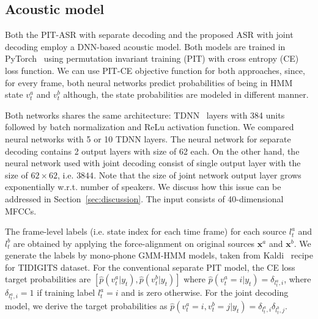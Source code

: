 \documentclass[a4paper]{article}
\newcommand{\spkrA}{a}
\newcommand{\spkrB}{b}
\def\x{{\mathbf x}}
\begin{document}
\subsection{Acoustic model}

Both the PIT-ASR with separate decoding and the proposed ASR with joint decoding employ a DNN-based acoustic model. Both models are trained in PyTorch~\cite{PyTorch} using permutation invariant training (PIT)\cite{kolbek2017,QIAN20181} with cross entropy (CE) loss function. We can use PIT-CE objective function for both approaches, since, for every frame, both neural networks predict probabilities of being in HMM state $v_t^\spkrA$ and $v_t^\spkrB$ although, the state probabilities are modeled in different manner.

Both networks shares the same architecture: TDNN~\cite{peddinti15b_tdnn} layers with 384 units followed by batch normalization and ReLu activation function. We compared neural networks with 5 or 10 TDNN layers. The neural network for separate decoding contains 2 output layers with size of 62 each. On the other hand, the neural network used with joint decoding consist of single output layer with the size of $62\times62$, i.e. $3844$. Note that the size of joint network output layer grows exponentially w.r.t. number of speakers. We discuss how this issue can be addressed in Section~\ref{sec:discussion}. The input consists of 40-dimensional MFCCs.

The frame-level labels (i.e. state index for each time frame) for each source $l_t^\spkrA$ and $l_t^\spkrB$ are obtained by applying the force-alignment on original sources $\x^\spkrA$ and $\x^\spkrB$.  We generate the labels by mono-phone GMM-HMM models, taken from Kaldi~\cite{Kaldi} recipe for TIDIGITS dataset.
For the conventional separate PIT model, the CE loss target probabilities
are $[\hat{p}(v_t^{\spkrA}|y_t), \hat{p} (v_t^{\spkrB}|y_t)]$ where $\hat{p}(v_t^{\spkrA}=i|y_t) = \delta_{l_t^{\spkrA},i}$, 
where $\delta_{l_t^{\spkrA},i} = 1$ if training label $l_t^{\spkrA} = i$ and is zero otherwise.
For the joint decoding model, we derive the target probabilities as $ \hat{p}(v_t^{\spkrA}=i, v_t^{\spkrB}=j | y_t) = \delta_{l_t^{\spkrA},i} \delta_{l_t^{\spkrB},j} $.
\end{document}
